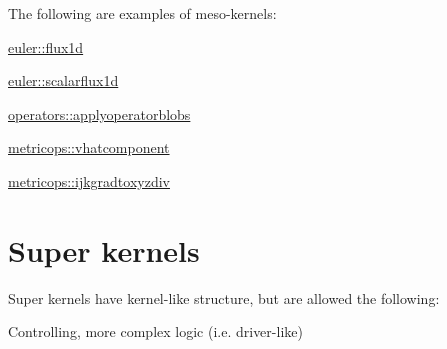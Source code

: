 The following are examples of meso-\/kernels\+:


\begin{DoxyItemize}
\item \hyperlink{namespaceeuler_a75d1a7e992d0b046ee381c90d22d4c44}{euler\+::flux1d}
\item \hyperlink{namespaceeuler_ab9baf301102dd29f97d17d6550f7b527}{euler\+::scalarflux1d}
\item \hyperlink{namespaceoperators_a526cfaf4061ff38e8b9cba873cb1392c}{operators\+::applyoperatorblobs}
\item \hyperlink{namespacemetricops_af0813d14ff29789b3c8f479b4bcecd3d}{metricops\+::vhatcomponent}
\item \hyperlink{namespacemetricops_a1ff97a9829721adfee8965698ac1a884}{metricops\+::ijkgradtoxyzdiv}
\end{DoxyItemize}\hypertarget{kernel_documentation_SuperKernels}{}\section{Super kernels}\label{kernel_documentation_SuperKernels}
Super kernels have kernel-\/like structure, but are allowed the following\+:


\begin{DoxyItemize}
\item Controlling, more complex logic (i.\+e. driver-\/like) 
\end{DoxyItemize}
